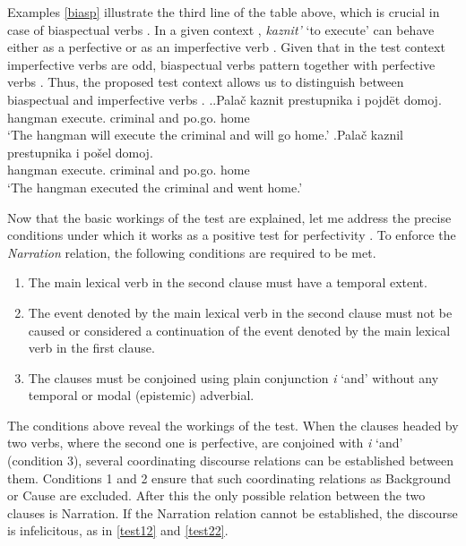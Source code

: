 Examples \ref{biasp} illustrate the third line of the table above, which is crucial in case of biaspectual verbs . In a given context  , \textit{kaznit'} `to execute' can behave either as a perfective or as an imperfective verb . Given that in the test context   imperfective verbs  are odd, biaspectual verbs  pattern together with perfective verbs . Thus, the proposed test context   allows us to distinguish between biaspectual and imperfective verbs . 
\ex.\label{biasp}\ag.Pala\v{c} kaznit prestupnika i pojd\"et\textsuperscript{\PF} domoj.\\
hangman execute. criminal and po.go. home\\
`The hangman will execute the criminal and will go home.'
\bg.Pala\v{c} kaznil prestupnika i po\v{s}el\textsuperscript{\PF} domoj.\\
hangman execute. criminal and po.go. home\\
`The hangman executed the criminal and went home.'

Now that the basic workings of the test are explained, let me address the precise conditions under which it works as a positive test for perfectivity . To enforce the \textit{Narration} relation, the following conditions are required to be met.
\begin{enumerate}
\item The main lexical verb in the second clause must have a temporal extent.
\item The event denoted by the main lexical verb in the second clause must not be caused or considered a continuation of the event denoted by the main lexical verb in the first clause.
\item The clauses must be conjoined using plain conjunction  \textit{i} `and' without any temporal or modal (epistemic) adverbial.
\end{enumerate}
The conditions above reveal the workings of the test. When the clauses headed by two verbs, where the second one is perfective, are conjoined with \textit{i} `and' (condition 3), several coordinating discourse relations  can be established between them. Conditions 1 and 2 ensure that such coordinating relations as Background  or Cause are excluded. After this the only possible relation between the two clauses is Narration. If the Narration relation   cannot be established, the discourse is infelicitous, as in \ref{test12} and \ref{test22}.

